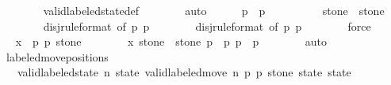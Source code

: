 \begin{isabellebody}
\ \ \ \ \ \ \isamarkupfalse%
\ valid{\isacharunderscore}labeled{\isacharunderscore}state{\isacharunderscore}def\isanewline
\ \ \ \ \ \ \isamarkupfalse%
\ auto\isanewline
\isanewline
\ \ \ \ \isamarkupfalse%
\ {\isachardoublequoteopen}p{}\ {\isacharequal}\ p{}{\isacharprime}{\isachardoublequoteclose}\isanewline
\ \ \ \ \ \ \isamarkupfalse%
\ {\isacharasterisk}{\isacharparenleft}{}{\isacharparenright}\ {\isacharasterisk}{\isacharasterisk}{\isacharparenleft}{}{\isacharparenright}\ {\isacharbackquoteopen}stone\ {\isacharequal}\ stone{\isacharprime}{\isacharbackquoteclose}\ {\isacharasterisk}{\isacharparenleft}{}{\isacharparenright}\ {\isacharasterisk}{\isacharasterisk}{\isacharparenleft}{}{\isacharparenright}\isanewline
\ \ \ \ \ \ \isamarkupfalse%
\ disj{\isacharprime}{\isacharbrackleft}rule{\isacharunderscore}format{\isacharcomma}\ of\ p{}\ p{}{\isacharprime}{\isacharbrackright}\isanewline
\ \ \ \ \ \ \isamarkupfalse%
\ disj{\isacharprime}{\isacharbrackleft}rule{\isacharunderscore}format{\isacharcomma}\ of\ p{}{\isacharprime}\ p{}{\isacharbrackright}\isanewline
\ \ \ \ \ \ \isamarkupfalse%
\ force\isanewline
\isanewline
\ \ \ \ \isamarkupfalse%
\ \isamarkupfalse%
\ {\isachardoublequoteopen}x\ {\isacharequal}\ {\isacharparenleft}p{}{\isacharcomma}\ p{}{\isacharcomma}\ stone{\isacharparenright}{\isachardoublequoteclose}\isanewline
\ \ \ \ \ \ \isamarkupfalse%
\ x\ {\isacharbackquoteopen}stone\ {\isacharequal}\ stone{\isacharprime}{\isacharbackquoteclose}\ {\isacharbackquoteopen}p{}\ {\isacharequal}\ p{}{\isacharprime}{\isacharbackquoteclose}\ {\isacharbackquoteopen}p{}\ {\isacharequal}\ p{}{\isacharprime}{\isacharbackquoteclose}\isanewline
\ \ \ \ \ \ \isamarkupfalse%
\ auto\isanewline
\ \ \isamarkupfalse%
\isanewline
{}\isamarkupfalse%
%
\endisatagproof
{\isafoldproof}%
%
\isadelimproof
\isanewline
%
\endisadelimproof
\isanewline
{}\isamarkupfalse%
\ labeled{\isacharunderscore}move{\isacharunderscore}positions{\isacharcolon}\isanewline
\ \ \ {\isachardoublequoteopen}valid{\isacharunderscore}labeled{\isacharunderscore}state\ n\ state{\isachardoublequoteclose}\ {\isachardoublequoteopen}valid{\isacharunderscore}labeled{\isacharunderscore}move{\isacharprime}\ n\ p{}\ p{}\ stone\ state\ state{\isacharprime}{\isachardoublequoteclose}\isanewline

\end{isabellebody}
